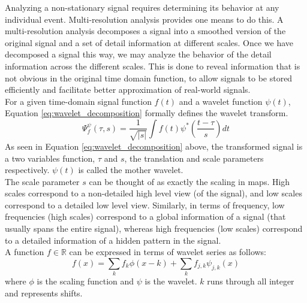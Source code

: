\documentclass[12pt,english]{report}
\begin{document}
Analyzing a non-stationary signal requires determining its behavior at any individual event. Multi-resolution analysis provides one means to do this. A multi-resolution analysis decomposes a signal into a smoothed version of the original signal and a set of detail information at different scales. Once we have decomposed a signal this way, we may analyze the behavior of the detail information across the different scales. This is done to reveal information that is not obvious in the original time domain function, to allow signals to be stored efficiently and facilitate better approximation of real-world signals. \\

For a given time-domain signal function $f(t)$ and a wavelet function $\psi(t)$, Equation \ref{eq:wavelet_decomposition} formally defines the wavelet transform.
\begin{equation}
\Psi^{\psi}_{f}(\tau, s)=\frac{1}{\sqrt{|s|}}\int{f(t)\psi^*(\frac{t-\tau}{s})dt}
\label{eq:wavelet_decomposition}
\end{equation}
As seen in Equation \ref{eq:wavelet_decomposition} above, the transformed signal is a two variables function, $\tau$ and $s$, the translation and scale parameters respectively. $\psi(t)$ is called the mother wavelet.\\

The scale parameter $s$ can be thought of as exactly the scaling in maps. High scales correspond to a non-detailed high level view (of the signal), and low scales correspond to a detailed low level view. Similarly, in terms of frequency, low frequencies (high scales) correspond to a global information of a signal (that usually spans the entire signal), whereas high frequencies (low scales) correspond to a detailed information of a hidden pattern in the signal.\\

A function $f \in \mathbb{R}$ can be expressed in terms of wavelet series as follows:
\begin{equation}
f(x)=\sum\limits_{k}{f_k \phi(x-k)}+\sum\limits_{k}{f_{j,k}\psi_{j,k}(x)}
\end{equation}
where $\phi$ is the scaling function and $\psi$ is the wavelet. $k$ runs through all integer and represents shifts.\\



\end{document}
